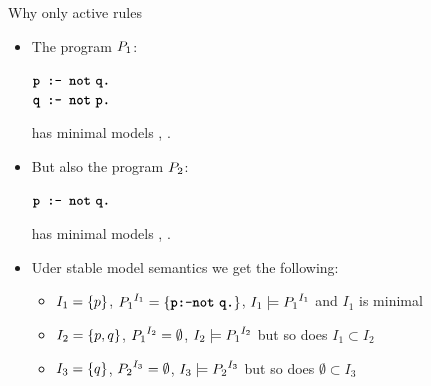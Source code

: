 \documentclass[trans,draft]{beamer} %
\begin{document}
\begin{frame}{Why only active rules}
	\onslide<+->
	
	\begin{itemize}
		\item The program $\prog_1$:
		\begin{center}
			$\code{p :- not}\ \code{q.}$\\
			$\code{q :- not}\ \code{p.}$
		\end{center}
		has minimal models , .
		
		\item But also the program $\prog_2$:
		\begin{center}
			$\code{p :- not}\ \code{q.}$
		\end{center}
		has minimal models , {\color{red}}.
		
		\onslide<+->
		
		\item Uder stable model semantics we get the following:
		\begin{itemize}
			\item $I_1 = \set{p}$, $\activerules{I_1}{\prog_1} = \set{\code{p:-not}\ \code{q.}}$, $I_1\models\activerules{I_1}{\prog_1}$ and $I_1$ is minimal\\
			\onslide<+->
			\item $I_2 = \set{p,q}$, $\activerules{I_2}{\prog_1} = \emptyset$, $I_2\models\activerules{I_2}{\prog_1}$ but so does $I_1 \subset I_2$\\
			\onslide<+->
			\item $I_3 = \set{q}$, $\activerules{I_3}{\prog_2} = \emptyset$, $I_3\models\activerules{I_3}{\prog_2}$ but so does $\emptyset \subset I_3$
		\end{itemize}
		
	\end{itemize}
	
\end{frame}
\end{document}
